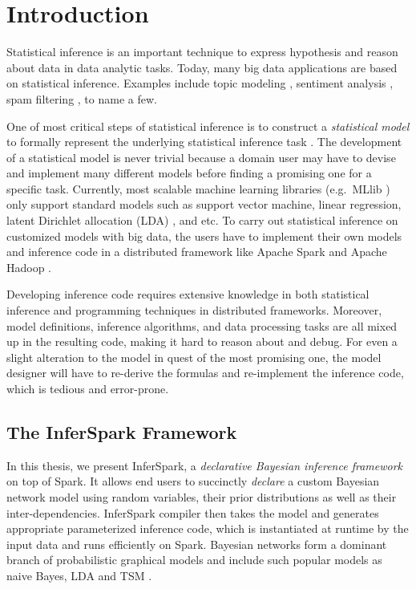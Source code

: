 
\chapter{Introduction}
\label{chap:intro}

Statistical inference is an important technique to express hypothesis and
reason about data in data analytic tasks.  Today, many big data applications
are based on statistical inference. Examples include topic modeling
, sentiment analysis , spam filtering , to name a few.

One of most critical steps of statistical inference is to construct a
\emph{statistical model} to formally represent the underlying statistical
inference task . The development of a statistical model is never
trivial because a domain user may have to devise and implement many  different
models before finding a promising one for a specific task. Currently, most
scalable machine learning libraries (e.g.~MLlib ) only support
standard models such as support vector machine, linear regression, latent
Dirichlet allocation (LDA) , and etc. To carry out
statistical inference on customized models with big data, the users have to
implement their own models and inference code in a distributed framework like
Apache Spark  and Apache Hadoop
.

Developing inference code requires extensive knowledge in both statistical
inference and programming techniques in distributed frameworks. Moreover,
model definitions, inference algorithms, and data processing tasks are all
mixed up in the resulting code, making it hard to reason about and debug.  For
even a slight alteration to the model in quest of the most promising one, the
model designer will have to re-derive the formulas and re-implement the
inference code, which is tedious and error-prone. 

\section{The InferSpark Framework}
\label{sec:intro_inferspark}

In this thesis, we present InferSpark, a \emph{declarative Bayesian inference
framework} on top of Spark. It allows end users to succinctly {\em declare} a
 custom Bayesian network model using random variables, 
their prior distributions as well as
their inter-dependencies. InferSpark compiler then takes the model and generates
appropriate parameterized inference code, which is instantiated at runtime
by the input data and runs efficiently on Spark.
Bayesian networks form a dominant branch of probabilistic graphical models
and include such popular models as naive Bayes, LDA and TSM .

